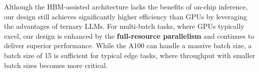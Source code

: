 \begin{table}[h]
    \vspace{-2mm}
    \centering
    \caption{Comparison of \textit{TerEffic} (HBM-assisted) architecture with GPU and a basic FPGA design\cite{scalable} for larger models}
    \label{tab:HBM_comparison} 
\end{table} 

Although the HBM-assisted architecture lacks the benefits of on-chip inference, our design still achieves significantly higher efficiency than GPUs by leveraging the advantages of ternary LLMs. For multi-batch tasks, where GPUs typically excel, our design is enhanced by the \textbf{full-resource parallelism} and continues to deliver superior performance. While the A100 can handle a massive batch size, a batch size of 15 is sufficient for typical edge tasks, where throughput with smaller batch sizes becomes more critical.

